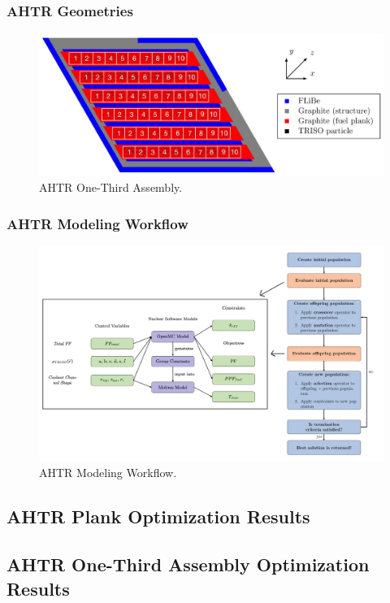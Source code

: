 \begin{frame}
    \frametitle{AHTR Geometries}
    \begin{figure}
        \includegraphics[width=\linewidth]{figures/ahtr-assembly-pres.png} 
        \caption{AHTR One-Third Assembly.}
    \end{figure}
\end{frame}

\begin{frame}
    \frametitle{AHTR Modeling Workflow}
    \begin{figure}
        \includegraphics[width=0.95\linewidth]{figures/ahtr-modeling-workflow.png} 
        \caption{AHTR Modeling Workflow.}
    \end{figure}
\end{frame}

\subsection{AHTR Plank Optimization Results}

\subsection{AHTR One-Third Assembly Optimization Results}